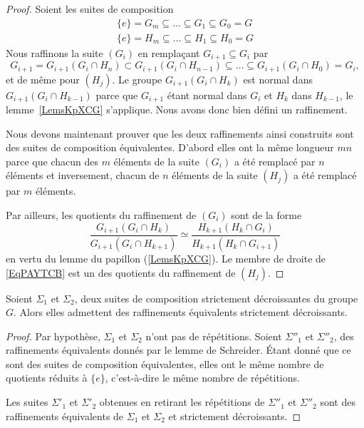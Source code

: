 \begin{proof}
    Soient les suites de composition
    \begin{subequations}
        \begin{align}
            \{ e \}=G_m\subseteq\ldots\subseteq G_1\subseteq G_0=G\\
            \{ e \}=H_m\subseteq\ldots\subseteq H_1\subseteq H_0=G
        \end{align}
    \end{subequations}
    Nous raffinons la suite \( (G_i)\) en remplaçant \( G_{i+1}\subseteq G_i\) par
    \begin{equation}
        G_{i+1}=G_{i+1}(G_i\cap H_n)\subset G_{i+1}(G_i\cap H_{n-1})\subseteq\ldots\subseteq G_{i+1}(G_i\cap H_0)=G_i,
    \end{equation}
    et de même pour \( (H_j)\). Le groupe \( G_{i+1}(G_i\cap H_k)\) est normal dans \( G_{i+1}(G_i\cap H_{k-1})\) parce que \( G_{i+1}\) étant normal dans \( G_i\) et \( H_k\) dans \( H_{k-1}\), le lemme~\ref{LemsKpXCG} s'applique. Nous avons donc bien défini un raffinement.

    Nous devons maintenant prouver que les deux raffinements ainsi construits sont des suites de composition équivalentes. D'abord elles ont la même longueur \( mn\) parce que chacun des \( m\) éléments de la suite \( (G_i)\) a été remplacé par \( n\) éléments et inversement, chacun de \( n\) éléments de la suite \( (H_j)\) a été remplacé par \( m\) éléments.

    Par ailleurs, les quotients du raffinement de \( (G_i)\) sont de la forme
    \begin{equation}    \label{EqPAYTCB}
        \frac{ G_{i+1}(G_i \cap H_k) }{ G_{i+1}(G_i\cap H_{k+1}) }\simeq \frac{ H_{k+1}(H_k\cap G_i) }{ H_{k+1}(H_k\cap G_{i+1}) }
    \end{equation}
    en vertu du lemme du papillon (\ref{LemsKpXCG}). Le membre de droite de \eqref{EqPAYTCB} est un des quotients du raffinement de \( (H_j)\).
\end{proof}

\begin{lemma}    \label{LemBSicRJ}
    Soient \( \Sigma_1\) et \( \Sigma_2\), deux suites de composition strictement décroissantes du groupe \( G\). Alors elles admettent des raffinements équivalents strictement décroissants.
\end{lemma}

\begin{proof}
    Par hypothèse, \( \Sigma_1\) et \( \Sigma_2\) n'ont pas de répétitions. Soient \( \Sigma''_1\) et \( \Sigma''_2\), des raffinements équivalents donnés par le lemme de Schreider. Étant donné que ce sont des suites de composition équivalentes, elles ont le même nombre de quotients réduits à \( \{ e \}\), c'est-à-dire le même nombre de répétitions.

    Les suites \( \Sigma'_1\) et \( \Sigma'_2\) obtenues en retirant les répétitions de \( \Sigma''_1\) et \( \Sigma''_2\) sont des raffinements équivalents de \( \Sigma_1\) et \( \Sigma_2\) et strictement décroissants.
\end{proof}


